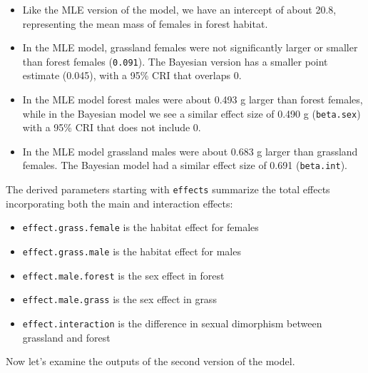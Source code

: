 \documentclass[
  13,
  letterpaper,
]{report}
\newenvironment{Shaded}{\begin{snugshade}}{\end{snugshade}}
\newcommand{\DecValTok}[1]{\textcolor[rgb]{0.68,0.00,0.00}{#1}}
\newcommand{\FloatTok}[1]{\textcolor[rgb]{0.68,0.00,0.00}{#1}}
\newcommand{\FunctionTok}[1]{\textcolor[rgb]{0.28,0.35,0.67}{#1}}
\newcommand{\NormalTok}[1]{\textcolor[rgb]{0.00,0.23,0.31}{#1}}
\newcommand{\SpecialCharTok}[1]{\textcolor[rgb]{0.37,0.37,0.37}{#1}}
\providecommand{\tightlist}{%
  \setlength{\itemsep}{0pt}\setlength{\parskip}{0pt}}
\begin{document}
\begin{itemize}
\tightlist
\item
  Like the MLE version of the model, we have an intercept of about 20.8,
  representing the mean mass of females in forest habitat.
\item
  In the MLE model, grassland females were not significantly larger or
  smaller than forest females (\texttt{0.091}). The Bayesian version has
  a smaller point estimate (0.045), with a 95\% CRI that overlaps 0.
\item
  In the MLE model forest males were about 0.493 g larger than forest
  females, while in the Bayesian model we see a similar effect size of
  0.490 g (\texttt{beta.sex}) with a 95\% CRI that does not include 0.
\item
  In the MLE model grassland males were about 0.683 g larger than
  grassland females. The Bayesian model had a similar effect size of
  0.691 (\texttt{beta.int}).
\end{itemize}

The derived parameters starting with \texttt{effects} summarize the
total effects incorporating both the main and interaction effects:

\begin{itemize}
\tightlist
\item
  \texttt{effect.grass.female} is the habitat effect for females
\item
  \texttt{effect.grass.male} is the habitat effect for males
\item
  \texttt{effect.male.forest} is the sex effect in forest
\item
  \texttt{effect.male.grass} is the sex effect in grass
\item
  \texttt{effect.interaction} is the difference in sexual dimorphism
  between grassland and forest
\end{itemize}

Now let's examine the outputs of the second version of the model.

\begin{Shaded}
\end{Shaded}
\end{document}
